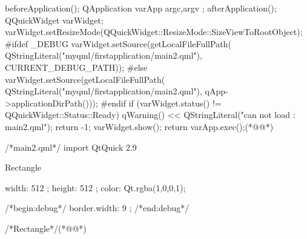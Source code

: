 \label{f000021}    %
\FloatBarrier                                  %
\begin{thebookfilesourceone}[escapeinside={(*@}{@*)},
caption=GoodLuck,
title=\filesourcenumbernameone \thefilesourcenumber
,firstnumber=90]
beforeApplication();
QApplication varApp{ argc,argv };
afterApplication();
QQuickWidget varWidget;
varWidget.setResizeMode(QQuickWidget::ResizeMode::SizeViewToRootObject);
#ifdef _DEBUG
varWidget.setSource(getLocalFileFullPath(
    QStringLiteral("myqml/firstapplication/main2.qml"),
    CURRENT_DEBUG_PATH));
#else
varWidget.setSource(getLocalFileFullPath(
    QStringLiteral("myqml/firstapplication/main2.qml"),
    qApp->applicationDirPath()));
#endif
if (varWidget.status() != QQuickWidget::Status::Ready) {
    qWarning() << QStringLiteral("can not load : main2.qml");
    return -1;
}
varWidget.show();
return varApp.exec();(*@\marginpar[\hfill\setlength\fboxsep{2pt}\fbox{\footnotesize{\kaishu\parbox{1em}{\setlength{\baselineskip}{2pt}\filesourcenumbernameone}}\footnotesize{\thefilesourcenumber}}]{\setlength\fboxsep{2pt}\fbox{\footnotesize{\kaishu\parbox{1em}{\setlength{\baselineskip}{2pt}\filesourcenumbernameone}}\footnotesize{\thefilesourcenumber}}}@*)\end{thebookfilesourceone}          %
\addtocounter{lstlisting}{-1}   %
\label{f000024}    %
\FloatBarrier                                  %
\begin{thebookfilesourceone}[escapeinside={(*@}{@*)},
caption=GoodLuck,
title=\filesourcenumbernameone \thefilesourcenumber
]
/*main2.qml*/
import QtQuick 2.9

Rectangle{

    width: 512 ;
    height: 512 ;
    color: Qt.rgba(1,0,0,1);

/*begin:debug*/
    border.width: 9 ;
/*end:debug*/


}/*Rectangle*/(*@\marginpar[\hfill\setlength\fboxsep{2pt}\fbox{\footnotesize{\kaishu\parbox{1em}{\setlength{\baselineskip}{2pt}\filesourcenumbernameone}}\footnotesize{\thefilesourcenumber}}]{\setlength\fboxsep{2pt}\fbox{\footnotesize{\kaishu\parbox{1em}{\setlength{\baselineskip}{2pt}\filesourcenumbernameone}}\footnotesize{\thefilesourcenumber}}}@*)\end{thebookfilesourceone}          %
\addtocounter{lstlisting}{-1}   %

